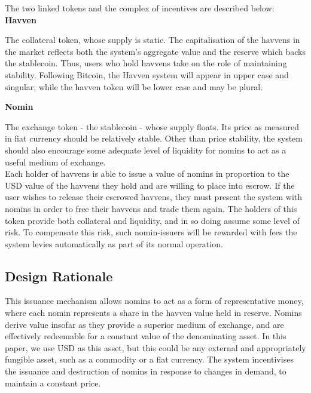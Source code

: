 \noindent The two linked tokens and the complex of incentives are described below: \\

\noindent \textbf{Havven}

\vspace{1mm}

\noindent The collateral token, whose supply is static.
The capitalisation of the havvens in the market reflects both the system's aggregate value and the reserve
which backs the stablecoin. Thus, users who hold havvens take on the role of maintaining stability.
Following Bitcoin, the Havven system will appear in upper case and singular; while the havven
token will be lower case and may be plural.

\vspace{2mm}

\noindent \textbf{Nomin}

\vspace{1mm}

\noindent The exchange token - the stablecoin - whose supply floats.
Its price as measured in fiat currency should be relatively stable.
Other than price stability, the system should also encourage some adequate level
of liquidity for nomins to act as a useful medium of exchange. \\

\noindent Each holder of havvens is able to issue a value of nomins in proportion to the USD value
of the havvens they hold and are willing to place into escrow. If the user wishes to release their escrowed havvens, they must present the system with nomins in order to free their havvens and trade them again.
The holders of this token provide both collateral and liquidity, and in so doing assume some
level of risk. To compensate this risk, such nomin-issuers will be rewarded with fees the system levies
automatically as part of its normal operation. \\

\subsection{Design Rationale}

\noindent This issuance mechanism allows nomins to act as a form of representative money, where each nomin represents a share in the havven value held in reserve. Nomins derive value insofar as they provide a superior medium of exchange, and are effectively redeemable for a constant value of the denominating asset. In this paper, we use USD as this asset, but this could be any external and appropriately fungible asset, such as a commodity or a fiat currency. The system incentivises the issuance and destruction of nomins in response to changes in demand, to maintain a constant price. \\

